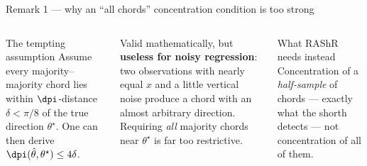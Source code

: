 \documentclass[aspectratio=169,9pt]{beamer}
\newcommand{\cR}{2.0}
\newcommand{\pdot}[2]{\fill[#2] ({\cR*cos(2*#1)},{\cR*sin(2*#1)}) circle (1.7pt);}
\newcommand{\projcircle}[1][30]{%
  \draw[mute,line width=0.9pt] (0,0) circle (\cR);
  \foreach \a in {0,#1,...,150}{%
    \draw[mute] ({(\cR-0.05)*cos(2*\a)},{(\cR-0.05)*sin(2*\a)}) -- ({(\cR+0.05)*cos(2*\a)},{(\cR+0.05)*sin(2*\a)});
    \node[font=\sffamily\tiny,mute] at ({(\cR+0.3)*cos(2*\a)},{(\cR+0.3)*sin(2*\a)}) {$\a^\circ$};}}
\newcommand{\arcdeg}[4]{%
  \draw[#3,line width=2.4pt,line cap=round] plot[domain=2*#1:2*#2,samples=40] ({(\cR+#4)*cos(\x)},{(\cR+#4)*sin(\x)});}
\begin{document}
\begin{frame}{Remark 1 --- why an ``all chords'' concentration condition is too strong}
\begin{columns}[T]
\begin{rrem}{The tempting assumption}
Assume every majority--majority chord lies within $\dpi$-distance $\delta<\pi/8$ of the true direction $\theta^\star$. One can then derive $\dpi(\hat\theta,\theta^\star)\le4\delta$.
\end{rrem}
\vspace{-2pt}
\small Valid mathematically, but \textbf{useless for noisy regression}: two observations with nearly equal $x$ and a little vertical noise produce a chord with an almost arbitrary direction. Requiring \emph{all} majority chords near $\theta^\star$ is far too restrictive.
\begin{rkey}{What RAShR needs instead}
Concentration of a \emph{half-sample} of chords --- exactly what the shorth detects --- not concentration of all of them.
\end{rkey}
\vspace{2pt}
\end{columns}
\end{frame}


\end{document}
